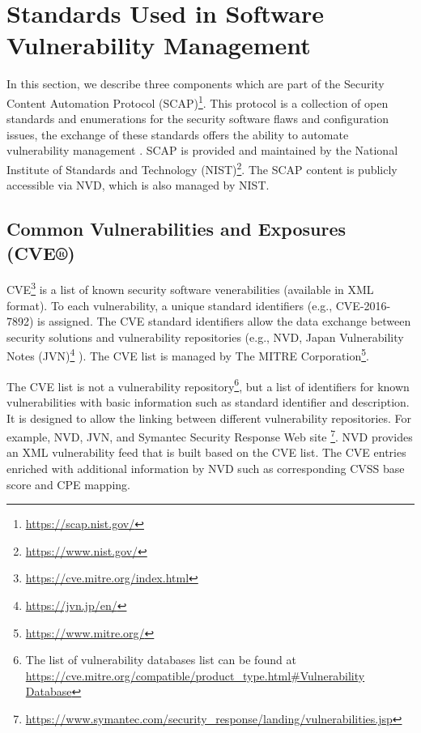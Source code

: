 \documentclass{llncs}
\begin{document}
\section{Standards	Used	in	Software	Vulnerability	Management}
 
 In	this section, we describe three	components which are part of the Security	 Content	Automation	Protocol (SCAP)\footnote{\url{https://scap.nist.gov/}}. This protocol is a collection of open standards and enumerations for the	security  software flaws	 and configuration issues, the exchange of these	standards	offers	the	ability	to	automate	vulnerability	management \cite{scap_doc}.		
 SCAP is provided	and	maintained	by	the	National	Institute	of	Standards	and	Technology (NIST)\footnote{\url{https://www.nist.gov/}}. The SCAP	content	is	publicly accessible via  NVD, which is also managed	by NIST.
 
 
 \subsection{Common Vulnerabilities and Exposures (CVE®)} 
 CVE\footnote{\url{https://cve.mitre.org/index.html}} is a list of known security software venerabilities (available in XML format). To each vulnerability, a unique standard identifiers (e.g., CVE-2016-7892) is assigned. The CVE standard identifiers allow the data exchange between security solutions and vulnerability repositories (e.g., NVD, Japan Vulnerability Notes (JVN)\footnote{\url{https://jvn.jp/en/}} ). The CVE list is managed by The MITRE Corporation\footnote{\url{https://www.mitre.org/}}.

 The CVE list is not a vulnerability repository\footnote{The list of vulnerability databases list can be found at \url{https://cve.mitre.org/compatible/product_type.html\#Vulnerability Database}}, but a list of identifiers for  known vulnerabilities with basic information such as standard identifier and description. It is designed to allow the linking between different vulnerability repositories. For example, NVD, JVN, and Symantec Security Response Web site \footnote{\url{https://www.symantec.com/security_response/landing/vulnerabilities.jsp}}.  NVD provides an XML vulnerability feed that is built based on the CVE list. The CVE entries enriched with additional information by NVD such as corresponding CVSS base score and CPE mapping.    
 
\end{document}
